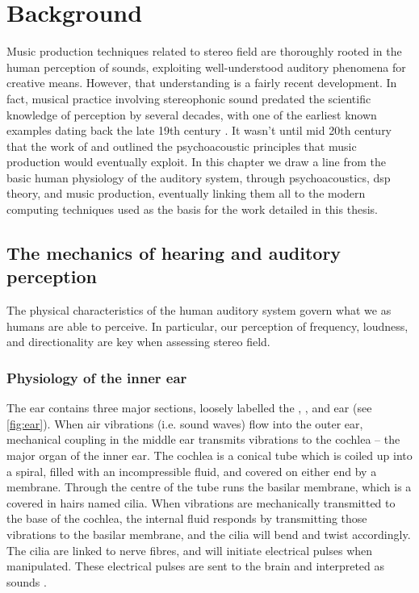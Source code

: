 \chapter{Background}
\label{ch:background}


Music production techniques related to stereo field are thoroughly rooted in the human perception of sounds, exploiting well-understood auditory phenomena for creative means. However, that understanding is a fairly recent development. In fact, musical practice involving stereophonic sound predated the scientific knowledge of perception by several decades, with one of the earliest known examples dating back the late 19th century \cite{munnTelephoneParisOpera1881}. It wasn't until mid 20th century that the work of  and  outlined the psychoacoustic principles that music production would eventually exploit. In this chapter we draw a line from the basic human physiology of the auditory system, through psychoacoustics, \gls{dsp} theory, and music production, eventually linking them all to the modern computing techniques used as the basis for the work detailed in this thesis. 

\section{The mechanics of hearing and auditory perception}
\label{sec:hearing}

The physical characteristics of the human auditory system govern what we as humans are able to perceive. In particular, our perception of frequency, loudness, and directionality are key when assessing stereo field. 

\subsection{Physiology of the inner ear}
\label{sec:inner_ear}

The ear contains three major sections, loosely labelled the , , and  ear (see \cref{fig:ear}). When air vibrations (i.e. sound waves) flow into the outer ear, mechanical coupling in the middle ear transmits vibrations to the cochlea -- the major organ of the inner ear. The cochlea is a conical tube which is coiled up into a spiral, filled with an incompressible fluid, and covered on either end by a membrane. Through the centre of the tube runs the basilar membrane, which is a covered in hairs named cilia. When vibrations are mechanically transmitted to the base of the cochlea, the internal fluid responds by transmitting those vibrations to the basilar membrane, and the cilia will bend and twist accordingly. The cilia are linked to nerve fibres, and will initiate electrical pulses when manipulated. These electrical pulses are sent to the brain and interpreted as sounds \cite{lindsayHumanInformationProcessing1972}.

